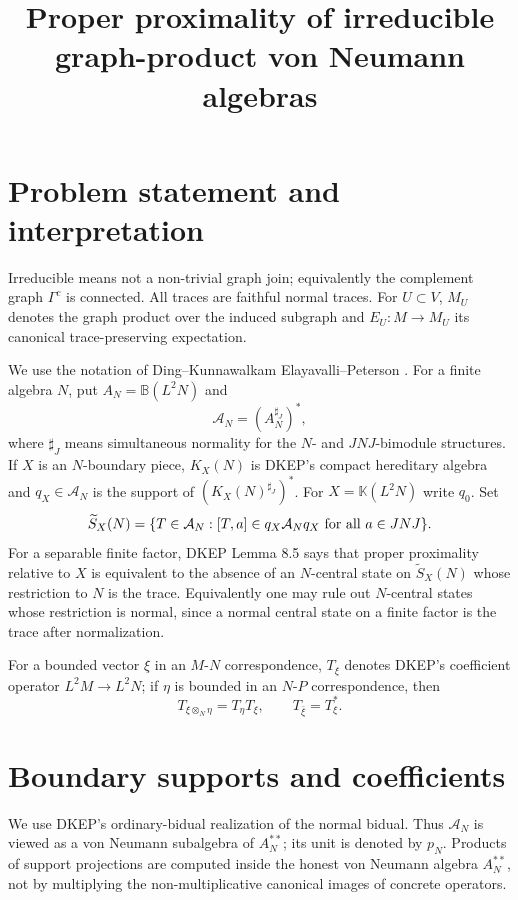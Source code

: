 \documentclass[12pt]{article}
\newcommand{\cA}{\mathcal A}
\begin{document}
\title{Proper proximality of irreducible graph-product von Neumann algebras}
\author{}
\date{}
\maketitle

\section*{Problem statement and interpretation}

Irreducible means not a non-trivial graph join; equivalently the complement
graph \(\Gamma^c\) is connected.  All traces are faithful normal traces.  For
\(U\subset V\), \(M_U\) denotes the graph product over the induced subgraph and
\(E_U:M\to M_U\) its canonical trace-preserving expectation.

We use the notation of Ding--Kunnawalkam Elayavalli--Peterson \cite{DKEP}.
For a finite algebra \(N\), put \(A_N=\mathbb B(L^2N)\) and
\[
        \cA_N=(A_N^{\sharp_J})^*,
\]
where \(\sharp_J\) means simultaneous normality for the \(N\)- and
\(JNJ\)-bimodule structures.  If \(X\) is an \(N\)-boundary piece, \(K_X(N)\)
is DKEP's compact hereditary algebra and \(q_X\in\cA_N\) is the support of
\((K_X(N)^{\sharp_J})^*\).  For \(X=\mathbb K(L^2N)\) write \(q_0\).  Set
\[
 \widetilde S_X(N)=\{T\in\cA_N:[T,a]\in q_X\cA_Nq_X\hbox{ for all }
 a\in JNJ\}.
\]
For a separable finite factor, DKEP Lemma 8.5 says that proper proximality
relative to \(X\) is equivalent to the absence of an \(N\)-central state on
\(\widetilde S_X(N)\) whose restriction to \(N\) is the trace.  Equivalently
one may rule out \(N\)-central states whose restriction is normal, since a
normal central state on a finite factor is the trace after normalization.

For a bounded vector \(\xi\) in an \(M\)-\(N\) correspondence, \(T_\xi\) denotes
DKEP's coefficient operator \(L^2M\to L^2N\); if \(\eta\) is bounded in an
\(N\)-\(P\) correspondence, then
\[
        T_{\xi\otimes_N\eta}=T_\eta T_\xi,\qquad
        T_{\bar\xi}=T_\xi^* .                                    \tag{1}
\]

\section*{Boundary supports and coefficients}

We use DKEP's ordinary-bidual realization of the normal bidual.  Thus
\(\cA_N\) is viewed as a von Neumann subalgebra of \(A_N^{**}\); its unit is
denoted by \(p_N\).  Products of support projections are computed inside the
honest von Neumann algebra \(A_N^{**}\), not by multiplying the
non-multiplicative canonical images of concrete operators.
\end{document}
